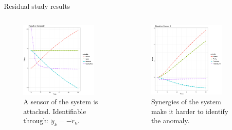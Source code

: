 \documentclass{beamer}
\begin{document}
\begin{frame}{Residual study results}
	\begin{columns}
		\begin{column}{0.45\textwidth}
			\begin{figure}
				\centering
				\includegraphics[width=0.9\textwidth]{attack_sensor2_2.png}
				\caption{A sensor of the system is attacked. Identifiable
				through: $ \dot{y}_k=-\dot{r}_k $.}
			\end{figure}
		\end{column}

		\begin{column}{0.45\textwidth}
			\begin{figure}
				\centering
				\includegraphics[width=0.9\textwidth]{attack_valve.png}
				\caption{Synergies of the system make it harder to identify the
				anomaly.}
			\end{figure}
		\end{column}
	\end{columns}
\end{frame}
\end{document}
